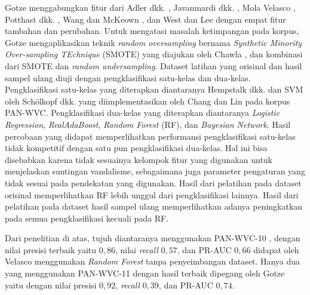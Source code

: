 Gotze \cite{gotze2014advanced} menggabungkan fitur dari Adler dkk.
\cite{adler2011wikipedia}, Javanmardi dkk. \cite{javanmardi2011vandalism}, Mola
Velasco \cite{mola2012wikipedia}, Potthast dkk. \cite{potthast2008automatic},
Wang dan McKeown \cite{wang2010got}, dan West dan Lee
\cite{west2011multilingual} dengan empat fitur tambahan dan perubahan.
Untuk mengatasi masalah ketimpangan pada korpus, Gotze
\cite{gotze2014advanced}
mengaplikasikan teknik
\textit{random oversampling}
bernama
\textit{Synthetic Minority Over-sampling TEchnique} (SMOTE)
yang diajukan oleh Chawla
\cite{chawla2002smote},
dan kombinasi dari SMOTE dan
\textit{random undersampling}.
Dataset latihan yang orisinal dan hasil sampel ulang diuji dengan
pengklasifikasi satu-kelas dan dua-kelas.
Pengklasifikasi satu-kelas yang diterapkan diantaranya Hempstalk dkk.
\cite{hempstalk2008one}
dan SVM oleh Schölkopf dkk.
\cite{scholkopf1999support}
yang diimplementasikan oleh Chang dan Lin
\cite{chang2011libsvm}
pada korpus PAN-WVC.
Pengklasifikasi dua-kelas yang diterapkan diantaranya
\textit{Logistic Regression},
\textit{RealAdaBoost},
\textit{Random Forest} (RF), dan
\textit{Bayesian Network}.
Hasil percobaan yang didapat memperlihatkan performansi pengklasifikasi
satu-kelas tidak kompetitif dengan satu pun pengklasifikasi dua-kelas.
Hal ini bisa disebabkan karena tidak sesuainya kelompok fitur yang digunakan
untuk menjelaskan suntingan vandalisme, sebagaimana juga parameter pengaturan
yang tidak sesuai pada pendekatan yang digunakan.
Hasil dari pelatihan pada dataset orisinal memperlihatkan RF
lebih unggul dari pengklasifikasi lainnya.
Hasil dari pelatihan pada dataset hasil sampel ulang memperlihatkan adanya
peningkatkan pada semua pengklasifikasi kecuali pada RF.



Dari penelitian di atas, tujuh diantaranya menggunakan PAN-WVC-10
\cite{adler2010detecting}
\cite{adler2011wikipedia}
\cite{gotze2014advanced}
\cite{harpalani2011language}
\cite{mola2012wikipedia}
\cite{wang2010got}
\cite{west2011multilingual},
dengan nilai presisi terbaik yaitu $0,86$, nilai \textit{recall} $0,57$, dan
PR-AUC $0,66$ didapat oleh Velasco menggunakan \textit{Random Forest} tanpa
penyeimbangan dataset.
Hanya dua yang menggunakan PAN-WVC-11 \cite{gotze2014advanced}
\cite{west2011multilingual} dengan hasil terbaik dipegang oleh Gotze yaitu
dengan nilai presisi $0,92$, \textit{recall} $0,39$, dan PR-AUC $0,74$.
